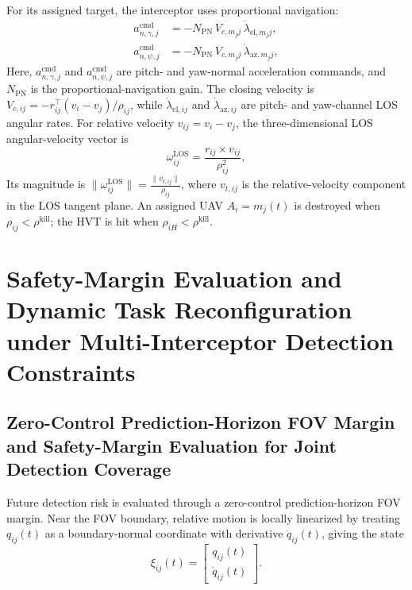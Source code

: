 \documentclass{cja}
\begin{document}
For its assigned target, the interceptor uses proportional navigation:
\begin{equation}
\begin{aligned}
a_{n,\gamma,j}^{\mathrm{cmd}}
&=-N_{\mathrm{PN}}\,V_{c,m_j j}\,\dot\lambda_{\mathrm{el},m_j j},\\
a_{n,\psi,j}^{\mathrm{cmd}}
&=-N_{\mathrm{PN}}\,V_{c,m_j j}\,\dot\lambda_{\mathrm{az},m_j j},
\end{aligned}
\label{eq:def-guid-pn}
\end{equation}
Here, $a_{n,\gamma,j}^{\mathrm{cmd}}$ and $a_{n,\psi,j}^{\mathrm{cmd}}$ are pitch- and yaw-normal acceleration commands, and $N_{\mathrm{PN}}$ is the proportional-navigation gain. The closing velocity is $V_{c,ij}=-r_{ij}^\top(v_i-v_j)/\rho_{ij}$, while $\dot\lambda_{\mathrm{el},ij}$ and $\dot\lambda_{\mathrm{az},ij}$ are pitch- and yaw-channel LOS angular rates. For relative velocity $v_{ij}=v_i-v_j$, the three-dimensional LOS angular-velocity vector is
\begin{equation}
\omega_{ij}^{\mathrm{LOS}} = \frac{r_{ij}\times v_{ij}}{\rho_{ij}^2},
\label{eq:omega_ij_def}
\end{equation}
Its magnitude is $\|\omega_{ij}^{\mathrm{LOS}}\| = \frac{\|v_{t,ij}\|}{\rho_{ij}}$, where $v_{t,ij}$ is the relative-velocity component in the LOS tangent plane. An assigned UAV $A_i=m_j(t)$ is destroyed when $\rho_{ij}<\rho^{\mathrm{kill}}$; the HVT is hit when $\rho_{iH}<\rho^{\mathrm{kill}}$.

\section{Safety-Margin Evaluation and Dynamic Task Reconfiguration under Multi-Interceptor Detection Constraints}

\subsection{Zero-Control Prediction-Horizon FOV Margin and Safety-Margin Evaluation for Joint Detection Coverage}

Future detection risk is evaluated through a zero-control prediction-horizon FOV margin. Near the FOV boundary, relative motion is locally linearized by treating $q_{ij}(t)$ as a boundary-normal coordinate with derivative $\dot q_{ij}(t)$, giving the state
\begin{equation}
\xi_{ij}(t)=
\begin{bmatrix}
q_{ij}(t)\\
\dot q_{ij}(t)
\end{bmatrix}.
\end{equation}
\end{document}
